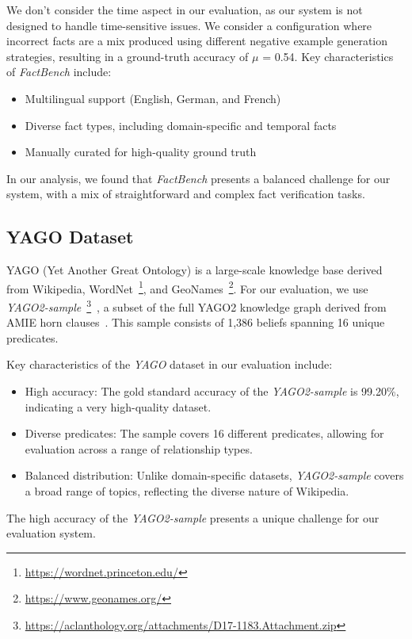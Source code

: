We don't consider the time aspect in our evaluation, as our system is not designed to handle time-sensitive issues.
We consider a configuration where incorrect facts are a mix produced using different negative example generation strategies, resulting in a ground-truth accuracy of $\mu$ = 0.54.
Key characteristics of \textit{FactBench} include:
\begin{itemize}
    \item Multilingual support (English, German, and French)
    \item Diverse fact types, including domain-specific and temporal facts
    \item Manually curated for high-quality ground truth
\end{itemize}

In our analysis, we found that \textit{FactBench} presents a balanced challenge for our system, with a mix of straightforward and complex fact verification tasks.
\subsection{YAGO Dataset}\label{subsec:empirical-evaluation:dataset-analysis:yago}
YAGO (Yet Another Great Ontology) is a large-scale knowledge base derived from Wikipedia, WordNet~\footnote{\url{https://wordnet.princeton.edu/}}, and GeoNames~\footnote{\url{https://www.geonames.org/}}.
For our evaluation, we use \textit{YAGO2-sample}~\footnote{\url{https://aclanthology.org/attachments/D17-1183.Attachment.zip}}~\cite{ojha-talukdar-2017-kgeval}, a subset of the full YAGO2 knowledge graph derived from AMIE horn clauses~\cite{Yago_AMIE}.
This sample consists of 1,386 beliefs spanning 16 unique predicates.

Key characteristics of the \textit{YAGO} dataset in our evaluation include:
\begin{itemize}
    \item High accuracy: The gold standard accuracy of the \textit{YAGO2-sample} is 99.20\%, indicating a very high-quality dataset.
    \item Diverse predicates: The sample covers 16 different predicates, allowing for evaluation across a range of relationship types.
    \item Balanced distribution: Unlike domain-specific datasets, \textit{YAGO2-sample} covers a broad range of topics, reflecting the diverse nature of Wikipedia.
\end{itemize}

The high accuracy of the \textit{YAGO2-sample} presents a unique challenge for our evaluation system.
